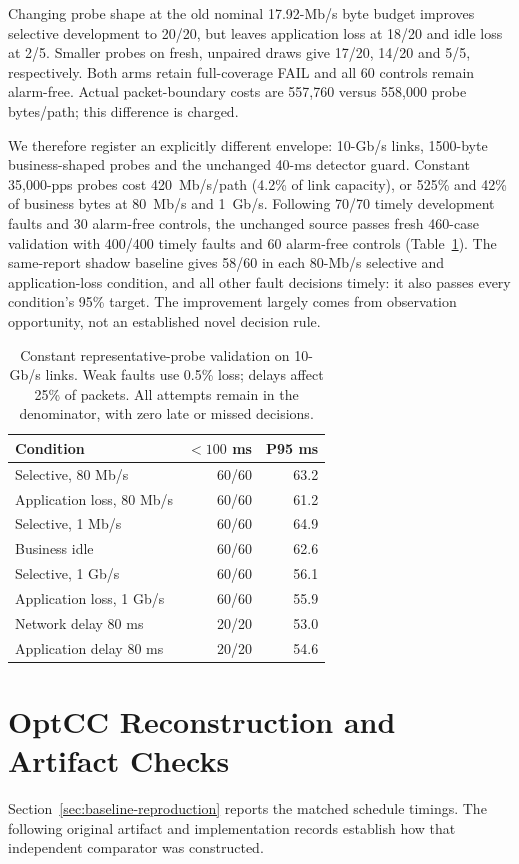 \documentclass[sigconf]{acmart}
\begin{document}
Changing probe shape at the old nominal 17.92-Mb/s byte budget improves
selective development to 20/20, but leaves application loss at 18/20 and
idle loss at 2/5. Smaller probes on fresh, unpaired draws give 17/20,
14/20 and 5/5, respectively. Both arms retain full-coverage FAIL and
all 60 controls remain alarm-free. Actual packet-boundary costs are
557,760 versus 558,000 probe bytes/path; this difference is charged.

We therefore register an explicitly different envelope: 10-Gb/s links,
1500-byte business-shaped probes and the unchanged 40-ms detector guard.
Constant 35,000-pps probes cost 420~Mb/s/path (4.2\% of link capacity),
or 525\% and 42\% of business bytes at 80~Mb/s and 1~Gb/s. Following
70/70 timely development faults and 30 alarm-free controls, the unchanged
source passes fresh 460-case validation with 400/400 timely faults and
60 alarm-free controls (Table~\ref{tab:business-validation}). The
same-report shadow baseline gives 58/60 in each 80-Mb/s selective and
application-loss condition, and all other fault decisions timely: it also
passes every condition's 95\% target. The improvement largely comes from
observation opportunity, not an established novel decision rule.

\begin{table}[t]
\caption{Constant representative-probe validation on 10-Gb/s links.
Weak faults use 0.5\% loss; delays affect 25\% of packets. All attempts
remain in the denominator, with zero late or missed decisions.}
\label{tab:business-validation}
\centering
\small
\setlength{\tabcolsep}{4pt}
\begin{tabular}{@{}lrr@{}}
\toprule
Condition & $<100$ ms & P95 ms \\
\midrule
Selective, 80 Mb/s & 60/60 & 63.2 \\
Application loss, 80 Mb/s & 60/60 & 61.2 \\
Selective, 1 Mb/s & 60/60 & 64.9 \\
Business idle & 60/60 & 62.6 \\
Selective, 1 Gb/s & 60/60 & 56.1 \\
Application loss, 1 Gb/s & 60/60 & 55.9 \\
Network delay 80 ms & 20/20 & 53.0 \\
Application delay 80 ms & 20/20 & 54.6 \\
\bottomrule
\end{tabular}
\end{table}

\section{OptCC Reconstruction and Artifact Checks}
\label{app:optcc}
Section~\ref{sec:baseline-reproduction} reports the matched schedule timings.
The following original artifact and implementation records establish how
that independent comparator was constructed.
\end{document}
